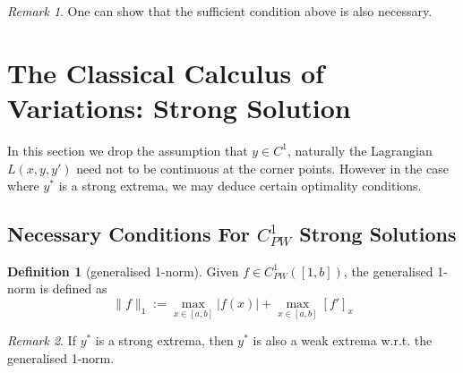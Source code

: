 \documentclass[a4paper,11pt,fleqn]{book}
\theoremstyle{definition}
\newtheorem{definition}{Definition}[section]
\theoremstyle{remark}
\newtheorem*{remark}{Remark}
\begin{document}
\begin{remark}
	One can show that the sufficient condition above is also necessary. 
\end{remark}



\section{The Classical Calculus of Variations: Strong Solution}
In this section we drop the assumption that $y \in C^1$, naturally the Lagrangian $L(x, y, y')$ need not to be continuous at the corner points. However in the case where $y^*$ is a strong extrema, we may deduce certain optimality conditions. 

\subsection{Necessary Conditions For $C_{PW}^1$ Strong Solutions}
\begin{definition}[generalised 1-norm]
	Given $f \in C_{PW}^1([1, b])$, the generalised 1-norm is defined as
	\begin{equation}
		\|f \|_1 := \max_{ x \in [a, b]} |f(x)| + \max_{x \in [a, b]} [f']_x
	\end{equation}
\end{definition}
\begin{remark}
If $y^*$ is a strong extrema, then $y^*$ is also a weak extrema w.r.t. the generalised 1-norm. 	
\end{remark}
\end{document}

